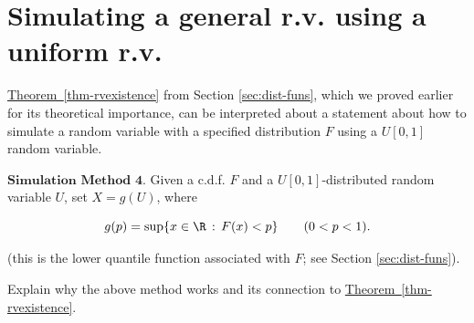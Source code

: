 \section{Simulating a general r.v. using a uniform r.v.}

\hyperref[thm-rvexistence]{Theorem~\ref*{thm-rvexistence}} from Section
\ref{sec:dist-funs}, which we proved earlier for its
theoretical importance, can be interpreted about a
statement about how to simulate a random variable with
a specified distribution $F$ using a $U[0,1]$ random
variable.

$\textbf{Simulation Method 4.}$ Given a c.d.f. $F$
and a $U[0,1]$-distributed random variable $U$, set
$X=g(U)$, where

\[
g(p) = \sup \{ x\in\R\,:\, F(x) < p \} \qquad (0<p<1).
\]

\noindent (this is the lower quantile function associated with
$F$; see Section \ref{sec:dist-funs}).

\begin{xexercise}
Explain why the above method works and its connection
to \hyperref[thm-rvexistence]{Theorem~\ref*{thm-rvexistence}}.
\end{xexercise}
